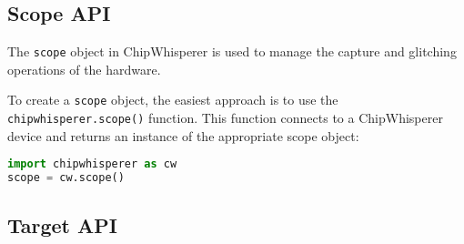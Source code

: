 \subsection{Scope API}
The \texttt{scope} object in ChipWhisperer is used to manage the capture and glitching operations of the hardware.

To create a \texttt{scope} object, the easiest approach is to use the \texttt{chipwhisperer.scope()} function. This function connects to a ChipWhisperer device and returns an instance of the appropriate scope object:

\begin{lstlisting}[language=Python]
import chipwhisperer as cw
scope = cw.scope()
\end{lstlisting}

\subsection{Target API}

\subsection{}